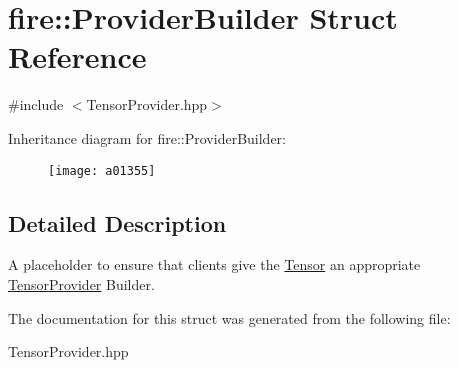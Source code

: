 \hypertarget{a01355}{}\section{fire\+:\+:Provider\+Builder Struct Reference}
\label{a01355}


{\ttfamily \#include $<$Tensor\+Provider.\+hpp$>$}

Inheritance diagram for fire\+:\+:Provider\+Builder\+:\begin{figure}[H]
\begin{center}
\leavevmode
\texttt{[image: a01355]}
\end{center}
\end{figure}


\subsection{Detailed Description}
A placeholder to ensure that clients give the \hyperlink{a01347}{Tensor} an appropriate \hyperlink{a01351}{Tensor\+Provider} Builder. 

The documentation for this struct was generated from the following file\+:\begin{DoxyCompactItemize}
\item 
Tensor\+Provider.\+hpp\end{DoxyCompactItemize}
